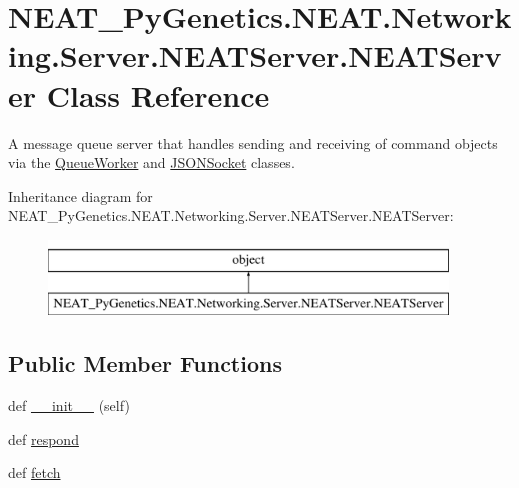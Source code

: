\hypertarget{classNEAT__PyGenetics_1_1NEAT_1_1Networking_1_1Server_1_1NEATServer_1_1NEATServer}{}\section{N\+E\+A\+T\+\_\+\+Py\+Genetics.\+N\+E\+A\+T.\+Networking.\+Server.\+N\+E\+A\+T\+Server.\+N\+E\+A\+T\+Server Class Reference}
\label{classNEAT__PyGenetics_1_1NEAT_1_1Networking_1_1Server_1_1NEATServer_1_1NEATServer}


A message queue server that handles sending and receiving of command objects via the \hyperlink{classNEAT__PyGenetics_1_1NEAT_1_1Networking_1_1Server_1_1NEATServer_1_1QueueWorker}{Queue\+Worker} and \hyperlink{namespaceNEAT__PyGenetics_1_1NEAT_1_1Networking_1_1Server_1_1JSONSocket}{J\+S\+O\+N\+Socket} classes.  


Inheritance diagram for N\+E\+A\+T\+\_\+\+Py\+Genetics.\+N\+E\+A\+T.\+Networking.\+Server.\+N\+E\+A\+T\+Server.\+N\+E\+A\+T\+Server\+:\begin{figure}[H]
\begin{center}
\leavevmode
\includegraphics[height=2.000000cm]{classNEAT__PyGenetics_1_1NEAT_1_1Networking_1_1Server_1_1NEATServer_1_1NEATServer}
\end{center}
\end{figure}
\subsection*{Public Member Functions}
\begin{DoxyCompactItemize}
\item 
def \hyperlink{classNEAT__PyGenetics_1_1NEAT_1_1Networking_1_1Server_1_1NEATServer_1_1NEATServer_a45eb9c4003d9e0f4ae9c0e239423ddad}{\+\_\+\+\_\+init\+\_\+\+\_\+} (self)
\item 
def \hyperlink{classNEAT__PyGenetics_1_1NEAT_1_1Networking_1_1Server_1_1NEATServer_1_1NEATServer_a44ffcc6f56d71844827bd402bf4f0e63}{respond}
\item 
def \hyperlink{classNEAT__PyGenetics_1_1NEAT_1_1Networking_1_1Server_1_1NEATServer_1_1NEATServer_adf4c43680aa89998cf65bc6499f778a8}{fetch}
\end{DoxyCompactItemize}
